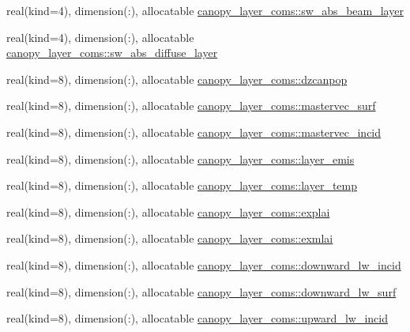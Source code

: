 \begin{DoxyCompactItemize}
\item 
real(kind=4), dimension(\+:), allocatable \hyperlink{namespacecanopy__layer__coms_a4b21c624d201e29290a77720b7147889}{canopy\+\_\+layer\+\_\+coms\+::sw\+\_\+abs\+\_\+beam\+\_\+layer}
\item 
real(kind=4), dimension(\+:), allocatable \hyperlink{namespacecanopy__layer__coms_ae4a19c01890d5696c625e6ec5c9f4760}{canopy\+\_\+layer\+\_\+coms\+::sw\+\_\+abs\+\_\+diffuse\+\_\+layer}
\item 
real(kind=8), dimension(\+:), allocatable \hyperlink{namespacecanopy__layer__coms_a2b048c0b2ff8eb8727cf9f8fe03106ce}{canopy\+\_\+layer\+\_\+coms\+::dzcanpop}
\item 
real(kind=8), dimension(\+:), allocatable \hyperlink{namespacecanopy__layer__coms_a8c414dd93e4a31f9c12fcd5f0dc58f98}{canopy\+\_\+layer\+\_\+coms\+::mastervec\+\_\+surf}
\item 
real(kind=8), dimension(\+:), allocatable \hyperlink{namespacecanopy__layer__coms_a591c2a154e305174ee01a6196c232957}{canopy\+\_\+layer\+\_\+coms\+::mastervec\+\_\+incid}
\item 
real(kind=8), dimension(\+:), allocatable \hyperlink{namespacecanopy__layer__coms_a483cdd99866eb34306b571c8a5929715}{canopy\+\_\+layer\+\_\+coms\+::layer\+\_\+emis}
\item 
real(kind=8), dimension(\+:), allocatable \hyperlink{namespacecanopy__layer__coms_a667b5b823a4ed89a6702be1e2589a645}{canopy\+\_\+layer\+\_\+coms\+::layer\+\_\+temp}
\item 
real(kind=8), dimension(\+:), allocatable \hyperlink{namespacecanopy__layer__coms_a5a321ac712c5b4936ce085767be7c552}{canopy\+\_\+layer\+\_\+coms\+::explai}
\item 
real(kind=8), dimension(\+:), allocatable \hyperlink{namespacecanopy__layer__coms_adf87d856a2233be223d80f826188f492}{canopy\+\_\+layer\+\_\+coms\+::exmlai}
\item 
real(kind=8), dimension(\+:), allocatable \hyperlink{namespacecanopy__layer__coms_a37049330a4fadfdf2eae9cbfcc91fe1b}{canopy\+\_\+layer\+\_\+coms\+::downward\+\_\+lw\+\_\+incid}
\item 
real(kind=8), dimension(\+:), allocatable \hyperlink{namespacecanopy__layer__coms_a496e9f59d415a923f750b48f0f099721}{canopy\+\_\+layer\+\_\+coms\+::downward\+\_\+lw\+\_\+surf}
\item 
real(kind=8), dimension(\+:), allocatable \hyperlink{namespacecanopy__layer__coms_ac0fbdef1967224d2069fe41c68ee8478}{canopy\+\_\+layer\+\_\+coms\+::upward\+\_\+lw\+\_\+incid}
\item 

\end{DoxyCompactItemize}
